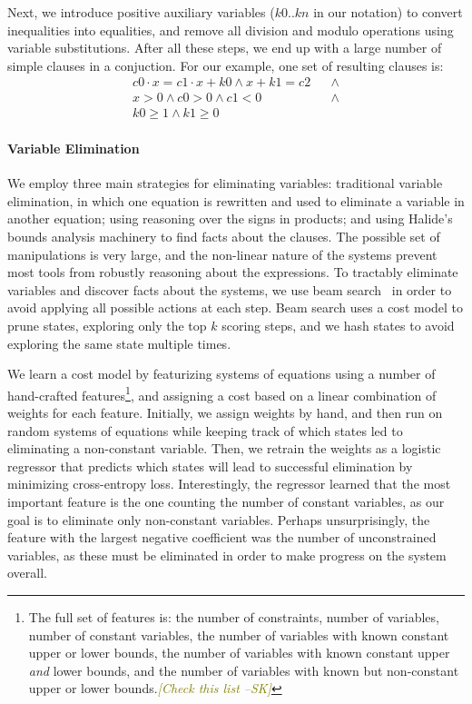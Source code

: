 \documentclass[sigplan,10pt,review,anonymous]{acmart}\settopmatter{printfolios=true,printccs=false,printacmref=false}
\newcommand{\sak}[1]{\textcolor{olive}{\textit{[{#1} --SK]}}}
\begin{document}
Next, we introduce positive auxiliary variables ($k0..kn$ in our notation) to convert
inequalities into equalities, and remove all division and modulo operations using
variable substitutions.  After all these steps, we end up with a large number of simple
clauses in a conjuction.  For our example, one set of resulting clauses is:
\begin{align*}
c0 \cdot x = c1 \cdot x + k0  \wedge x + k1 = c2 & & \wedge \\
x > 0 \wedge
c0 > 0 \wedge 
c1 < 0 & & \wedge  \\
k0 \geq 1 \wedge k1 \geq 0 & &
\end{align*}

\paragraph{Variable Elimination} We employ three main strategies for eliminating
variables: traditional variable elimination, in which one equation is rewritten and
used to eliminate a variable in another equation; using reasoning over the signs in products;
and using Halide's bounds analysis machinery to find facts about the clauses.  The possible
set of manipulations is very large, and the non-linear nature of the systems prevent most
tools from robustly reasoning about the expressions.  To tractably eliminate variables and discover
facts about the systems, we use beam search~\cite{beamsearch} in order to avoid applying
all possible actions at each step.  Beam search uses a cost model to prune states, exploring
only the top $k$ scoring steps, and we hash states to avoid exploring the same state multiple
times.

We learn a cost model by featurizing systems of equations using a number of hand-crafted
features\footnote{The full set of features is: the number of constraints, number of variables,
  number of constant variables, the number of variables with known constant upper or lower bounds,
  the number of variables with known constant upper \textit{and} lower bounds, and the number of
  variables with known but non-constant upper or lower bounds.\sak{Check this list}},
and assigning a cost based on a linear combination of weights for each feature.  Initially,
we assign weights by hand, and then run on random systems of equations while keeping track
of which states led to eliminating a non-constant variable.  Then, we retrain the weights
as a logistic regressor that predicts which states will lead to successful elimination
by minimizing cross-entropy loss.  Interestingly, the regressor learned that the most
important feature is the one counting the number of constant variables, as our goal
is to eliminate only non-constant variables.  Perhaps unsurprisingly, the feature
with the largest negative coefficient was the number of unconstrained variables, as
these must be eliminated in order to make progress on the system overall.
\end{document}
